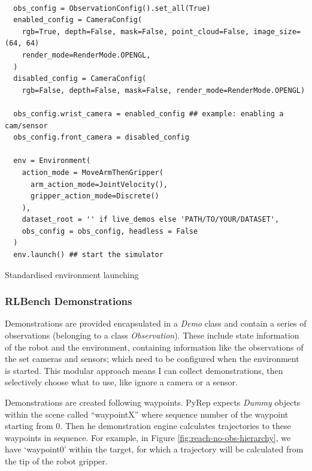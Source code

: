 \begin{listing}[H]
  \begin{verbatim}

  obs_config = ObservationConfig().set_all(True) 
  enabled_config = CameraConfig(
    rgb=True, depth=False, mask=False, point_cloud=False, image_size=(64, 64)
    render_mode=RenderMode.OPENGL,
  )
  disabled_config = CameraConfig(
    rgb=False, depth=False, mask=False, render_mode=RenderMode.OPENGL)

  obs_config.wrist_camera = enabled_config ## example: enabling a cam/sensor
  obs_config.front_camera = disabled_config

  env = Environment(
    action_mode = MoveArmThenGripper(
      arm_action_mode=JointVelocity(), 
      gripper_action_mode=Discrete()
    ),
    dataset_root = '' if live_demos else 'PATH/TO/YOUR/DATASET',
    obs_config = obs_config, headless = False
  )
  env.launch() ## start the simulator
  \end{verbatim}
  \caption{Standardised environment launching}\label{lst:env-setup}
\end{listing}

\subsubsection{RLBench Demonstrations}

      Demonstrations are provided encapsulated in a \emph{Demo} class and contain a series of observations (belonging to a class \emph{Observation}). These include state information of the robot and the environment, containing information like the observations of the set cameras and sensors; which need to be configured when the environment is started. This modular approach means I can collect demonstrations, then selectively choose what to use, like ignore a camera or a sensor. \par 
      Demonstrations are created following waypoints. PyRep expects  \emph{Dummy} objects within the scene called ``waypointX'' where sequence number of the waypoint starting from $0$. Then he demonstration engine calculates trajectories to these waypoints in sequence. For example, in Figure \ref{fig:reach-no-obs-hierarchy}, we have `waypoint0' within the target, for which a trajectory will be calculated from the tip of the robot gripper.

